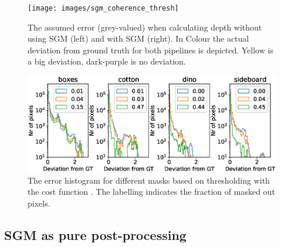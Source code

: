 \documentclass  [
  paper    = a4,
  BCOR     = 10mm,
  twoside,
  fontsize = 12pt,
  fleqn,
  toc      = bibnumbered,
  toc      = listofnumbered,
  numbers  = noendperiod,
  headings = normal,
  listof   = leveldown,
  version  = 3.03
]                                       {scrreprt}
\begin{document}
\begin{figure}[h!]
	\centering
	\texttt{[image: images/sgm\_coherence\_thresh]}
	\caption[SGM Coherence measure]{The assumed error (grey-valued) when calculating depth without using SGM (left) and with SGM (right). In Colour the actual deviation from ground truth for both pipelines is depicted. Yellow is a big deviation, dark-purple is no deviation.}
	\label{fig:sgmcoherencethresh}
\end{figure}



\begin{figure}[h!]
	\centering
	\includegraphics[width=1\linewidth]{images/histogram_error_mask_sgm}
	\caption[Histogram when masking errors with new error map]{The error histogram for different masks based on thresholding with the cost function . The labelling indicates the fraction of masked out pixels.}
	\label{fig:histogramerrormasksgm}
\end{figure}
\subsection{SGM as pure post-processing}
\label{sec:sgmppr_ev}
\end{document}
